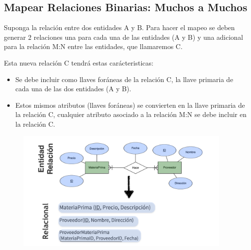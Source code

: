\documentclass[12pt, fleqn]{report}                             %
\begin{document}
            \clearpage
            \subsection{Mapear Relaciones Binarias: Muchos a Muchos}

                Suponga la relación entre dos entidades A y B.
                Para hacer el mapeo se deben generar 2 relaciones una para cada una de las entidades (A y B) y
                una adicional para la relación M:N entre las entidades, que llamaremos C.

                Esta nueva relación C tendrá estas carácteristicas:

                \begin{itemize}
                    \item
                        Se debe incluir como llaves foráneas de la relación C, la llave primaria de cada
                        una de las dos entidades (A y B).
                    \item
                        Estos mismos atributos (llaves foráneas) se convierten en la llave primaria de la
                        relación C, cualquier atributo asociado a la relación M:N se debe incluir en la relación C.
                \end{itemize}

                \begin{figure}[h]
                    \centering
                    \includegraphics[width=0.95\textwidth]{MapeoRelacionesBinariasMuchosMuchos}
                \end{figure}
\end{document}
